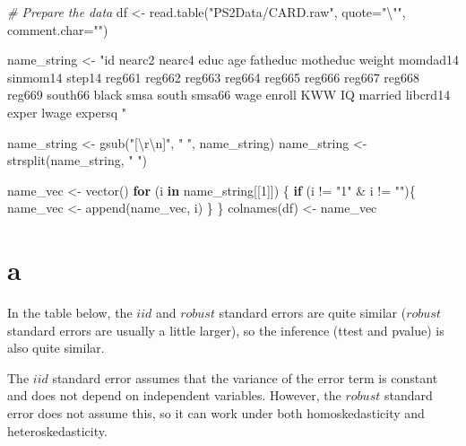 \documentclass[
]{article}
\newenvironment{Shaded}{\begin{snugshade}}{\end{snugshade}}
\newcommand{\AttributeTok}[1]{\textcolor[rgb]{0.77,0.63,0.00}{#1}}
\newcommand{\CommentTok}[1]{\textcolor[rgb]{0.56,0.35,0.01}{\textit{#1}}}
\newcommand{\ControlFlowTok}[1]{\textcolor[rgb]{0.13,0.29,0.53}{\textbf{#1}}}
\newcommand{\DecValTok}[1]{\textcolor[rgb]{0.00,0.00,0.81}{#1}}
\newcommand{\FunctionTok}[1]{\textcolor[rgb]{0.00,0.00,0.00}{#1}}
\newcommand{\NormalTok}[1]{#1}
\newcommand{\OtherTok}[1]{\textcolor[rgb]{0.56,0.35,0.01}{#1}}
\newcommand{\SpecialCharTok}[1]{\textcolor[rgb]{0.00,0.00,0.00}{#1}}
\newcommand{\StringTok}[1]{\textcolor[rgb]{0.31,0.60,0.02}{#1}}
\begin{document}
\begin{Shaded}
\begin{Highlighting}[]
\CommentTok{\# Prepare the data}
\NormalTok{df }\OtherTok{\textless{}{-}} \FunctionTok{read.table}\NormalTok{(}\StringTok{"PS2Data/CARD.raw"}\NormalTok{, }\AttributeTok{quote=}\StringTok{"}\SpecialCharTok{\textbackslash{}"}\StringTok{"}\NormalTok{, }\AttributeTok{comment.char=}\StringTok{""}\NormalTok{)}

\NormalTok{name\_string }\OtherTok{\textless{}{-}} \StringTok{"id   nearc2    nearc4    educ      age       fatheduc  motheduc  }
\StringTok{weight   momdad14  sinmom14  step14    reg661    reg662    reg663    reg664   }
\StringTok{reg665 reg666    reg667    reg668    reg669    south66   black     smsa   south    }
\StringTok{smsa66    wage      enroll    KWW       IQ        married   libcrd14  exper    }
\StringTok{lwage     expersq   "}

\NormalTok{name\_string }\OtherTok{\textless{}{-}} \FunctionTok{gsub}\NormalTok{(}\StringTok{"[}\SpecialCharTok{\textbackslash{}r\textbackslash{}n}\StringTok{]"}\NormalTok{, }\StringTok{" "}\NormalTok{, name\_string)}
\NormalTok{name\_string }\OtherTok{\textless{}{-}} \FunctionTok{strsplit}\NormalTok{(name\_string, }\StringTok{" "}\NormalTok{)}

\NormalTok{name\_vec }\OtherTok{\textless{}{-}} \FunctionTok{vector}\NormalTok{()}
\ControlFlowTok{for}\NormalTok{ (i }\ControlFlowTok{in}\NormalTok{ name\_string[[}\DecValTok{1}\NormalTok{]]) \{}
  \ControlFlowTok{if}\NormalTok{ (i }\SpecialCharTok{!=} \StringTok{"1"} \SpecialCharTok{\&}\NormalTok{ i }\SpecialCharTok{!=} \StringTok{""}\NormalTok{)\{}
\NormalTok{    name\_vec }\OtherTok{\textless{}{-}} \FunctionTok{append}\NormalTok{(name\_vec, i)}
\NormalTok{  \}}
\NormalTok{\}}
\FunctionTok{colnames}\NormalTok{(df) }\OtherTok{\textless{}{-}}\NormalTok{ name\_vec}
\end{Highlighting}
\end{Shaded}

\hypertarget{a-1}{%
\section{a}\label{a-1}}

In the table below, the \(iid\) and \(robust\) standard errors are quite
similar (\(robust\) standard errors are usually a little larger), so the
inference (ttest and pvalue) is also quite similar.

The \(iid\) standard error assumes that the variance of the error term
is constant and does not depend on independent variables. However, the
\(robust\) standard error does not assume this, so it can work under
both homoskedasticity and heteroskedasticity.
\end{document}
